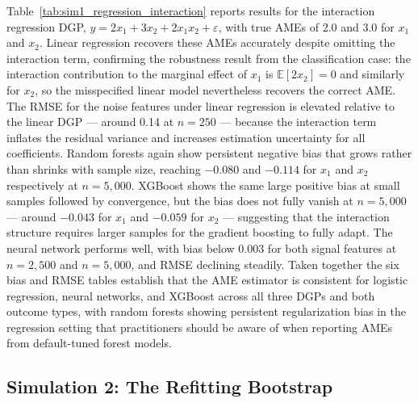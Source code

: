\documentclass[12pt,a4paper]{article}
\numberwithin{equation}{section}
\theoremstyle{plain}
\theoremstyle{definition}
\begin{document}
	Table~\ref{tab:sim1_regression_interaction} reports results for the interaction regression DGP, $y = 2x_1 + 3x_2 + 2x_1 x_2 + \varepsilon$, with true AMEs of 2.0 and 3.0 for $x_1$ and $x_2$. Linear regression recovers these AMEs accurately despite omitting the interaction term, confirming the robustness result from the classification case: the interaction contribution to the marginal effect of $x_1$ is $\mathbb{E}[2x_2] = 0$ and similarly for $x_2$, so the misspecified linear model nevertheless recovers the correct AME. The RMSE for the noise features under linear regression is elevated relative to the linear DGP --- around 0.14 at $n=250$ --- because the interaction term inflates the residual variance and increases estimation uncertainty for all coefficients. Random forests again show persistent negative bias that grows rather than shrinks with sample size, reaching $-0.080$ and $-0.114$ for $x_1$ and $x_2$ respectively at $n=5{,}000$. XGBoost shows the same large positive bias at small samples followed by convergence, but the bias does not fully vanish at $n=5{,}000$ --- around $-0.043$ for $x_1$ and $-0.059$ for $x_2$ --- suggesting that the interaction structure requires larger samples for the gradient boosting to fully adapt. The neural network performs well, with bias below 0.003 for both signal features at $n=2{,}500$ and $n=5{,}000$, and RMSE declining steadily. Taken together the six bias and RMSE tables establish that the AME estimator is consistent for logistic regression, neural networks, and XGBoost across all three DGPs and both outcome types, with random forests showing persistent regularization bias in the regression setting that practitioners should be aware of when reporting AMEs from default-tuned forest models.
	
	\subsection{Simulation 2: The Refitting Bootstrap}
	
\end{document}
